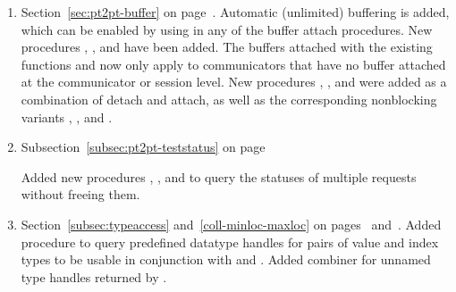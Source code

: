 \begin{enumerate}
\item Section~\ref{sec:pt2pt-buffer} on page~\pageref{sec:pt2pt-buffer}.
  \newline
  Automatic (unlimited) buffering is added, which can be enabled by using  in any of the buffer attach procedures.
  New procedures , ,
   and 
  have been\flushline %
 added.
  The buffers attached with the existing functions  and 
  now only apply to communicators that have no buffer attached at the communicator or session level.
  New procedures , , and
   were added as a combination of detach and attach, as well as the corresponding
  nonblocking variants , , and
  .

\item
 Subsection~\ref{subsec:pt2pt-teststatus} on page~\pageref{subsec:pt2pt-teststatus}
 \newline
 \begin{raggedright}
 Added new procedures , ,
 and  to \gb{}query the statuses of multiple requests without freeing them.
 \end{raggedright}

\item
  Section~\ref{subsec:typeaccess} and~\ref{coll-minloc-maxloc} on pages~\pageref{subsec:typeaccess} and~\pageref{coll-minloc-maxloc}.
  \newline
  Added procedure  to query predefined
  datatype handles for pairs of value and index types to be usable in
  conjunction with  and .
  Added combiner  for unnamed type handles
  returned by .


\end{enumerate}
